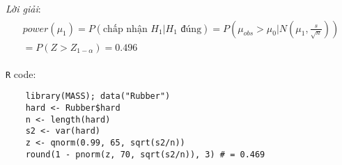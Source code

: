 \textit{Lời giải}:
\begin{align*}
    \begin{split}
        power(\mu_1) = P(\text{chấp nhận } H_1 | H_1 \text{ đúng}) = P\left(\mu_{obs} > \mu_0 | N\left(\mu_1, \frac{s}{\sqrt{n}}\right)\right) \\
        = P(Z > Z_{1 - \alpha}) = 0.496
    \end{split}
\end{align*}

\lstinline{R} code:

\begin{lstlisting}
    library(MASS); data("Rubber")
    hard <- Rubber$hard
    n <- length(hard)
    s2 <- var(hard)
    z <- qnorm(0.99, 65, sqrt(s2/n))
    round(1 - pnorm(z, 70, sqrt(s2/n)), 3) # = 0.469
\end{lstlisting}

